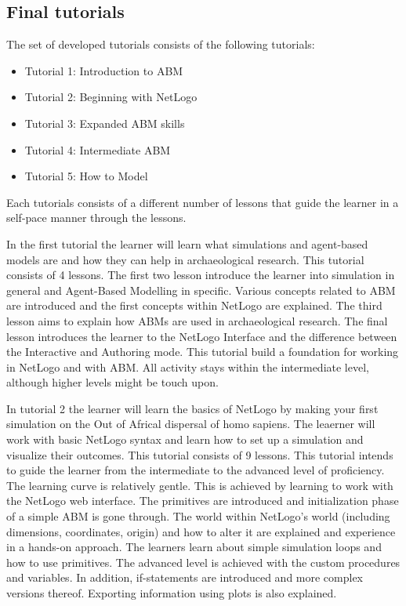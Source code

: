 \documentclass[
]{article}
\begin{document}
\hypertarget{final-tutorials}{%
\subsection{Final tutorials}\label{final-tutorials}}

The set of developed tutorials consists of the following tutorials:

\begin{itemize}
\item
  Tutorial 1: Introduction to ABM
\item
  Tutorial 2: Beginning with NetLogo
\item
  Tutorial 3: Expanded ABM skills
\item
  Tutorial 4: Intermediate ABM
\item
  Tutorial 5: How to Model
\end{itemize}

Each tutorials consists of a different number of lessons that guide the learner in a self-pace manner through the lessons.

In the first tutorial the learner will learn what simulations and agent-based models are and how they can help in archaeological research. This tutorial consists of 4 lessons. The first two lesson introduce the learner into simulation in general and Agent-Based Modelling in specific. Various concepts related to ABM are introduced and the first concepts within NetLogo are explained. The third lesson aims to explain how ABMs are used in archaeological research. The final lesson introduces the learner to the NetLogo Interface and the difference between the Interactive and Authoring mode. This tutorial build a foundation for working in NetLogo and with ABM. All activity stays within the intermediate level, although higher levels might be touch upon.

In tutorial 2 the learner will learn the basics of NetLogo by making your first simulation on the Out of Africal dispersal of homo sapiens. The leaerner will work with basic NetLogo syntax and learn how to set up a simulation and visualize their outcomes. This tutorial consists of 9 lessons. This tutorial intends to guide the learner from the intermediate to the advanced level of proficiency. The learning curve is relatively gentle. This is achieved by learning to work with the NetLogo web interface. The primitives are introduced and initialization phase of a simple ABM is gone through. The world within NetLogo's world (including dimensions, coordinates, origin) and how to alter it are explained and experience in a hands-on approach. The learners learn about simple simulation loops and how to use primitives. The advanced level is achieved with the custom procedures and variables. In addition, if-statements are introduced and more complex versions thereof. Exporting information using plots is also explained.
\end{document}
